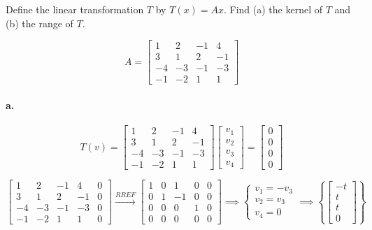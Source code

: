 \documentclass{report}
\begin{document}
\begin{tcolorbox}[colframe = lightred]
	Define the linear transformation $T$ by $T(x) = Ax$. Find (a) the kernel of $T$ and (b) the range of $T$.
	
	$$
	A = \begin{bmatrix} 1 & 2 & -1 & 4 \\ 3 & 1 & 2 & -1 \\ -4 & -3 & -1 & -3 \\ -1 & -2 & 1 & 1 \end{bmatrix}
	$$
\end{tcolorbox}

\paragraph{a.}

$$
T(v) = \begin{bmatrix}  1 & 2 & -1 & 4 \\ 3 & 1 & 2 & -1 \\ -4 & -3 & -1 & -3 \\ -1 & -2 & 1 & 1 \end{bmatrix} \begin{bmatrix} v_1 \\ v_2 \\ v_3 \\ v_4 \end{bmatrix} = \begin{bmatrix} 0 \\ 0 \\ 0 \\ 0 \end{bmatrix}
$$

$$
\begin{bmatrix} 1 & 2 & -1 & 4 & 0 \\ 3 & 1 & 2 & -1 & 0 \\ -4 & -3 & -1 & -3 & 0 \\ -1 & -2 & 1 & 1 & 0 \end{bmatrix} \xrightarrow{RREF} \begin{bmatrix} 1 & 0 & 1 & 0 & 0 \\ 0 & 1 & -1 &0 & 0 \\ 0 & 0 & 0 & 1 & 0 \\ 0 & 0 & 0 & 0 & 0 \end{bmatrix} \implies \begin{cases} v_1 = -v_3 \\ v_2 = v_3 \\ v_4 = 0 \end{cases} \implies \left\{ \begin{bmatrix} -t \\ t \\ t \\ 0 \end{bmatrix} \right\}
$$
\end{document}

